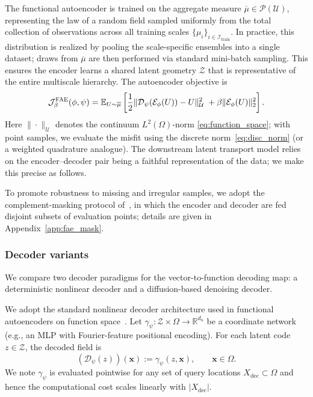\documentclass[review,onefignum,onetabnum]{siamart250211}
\newcommand{\E}{\mathbb{E}}
\newcommand{\R}{\mathbb{R}}
\newcommand{\1}{\mathbf{1}}
\newcommand{\cU}{\mathcal{U}}
\newcommand{\cZ}{\mathcal{Z}}
\newcommand{\cP}{\mathcal{P}}
\newcommand{\cJ}{\mathcal{J}}
\newcommand{\cE}{\mathcal{E}}
\newcommand{\cD}{\mathcal{D}}
\begin{document}
The functional autoencoder is trained on the aggregate measure $\overline{\mu} \in \cP(\cU)$, representing the law of a random field sampled uniformly from the total collection of observations across all training scales $\{ \mu_i \}_{i \in \mathcal{I}_{\mathrm{train}}}$. In practice, this distribution is realized by pooling the scale-specific ensembles into a single dataset; draws from $\overline{\mu}$ are then performed via standard mini-batch sampling. This ensures the encoder learns a shared latent geometry $\cZ$ that is representative of the entire multiscale hierarchy. The autoencoder objective is
\begin{equation}
\cJ_{\beta}^{\mathrm{\textsc{FAE}}}(\phi,\psi)
=
\E_{U \sim \overline{\mu}}\left[
\frac{1}{2}\|\cD_\psi(\cE_\phi(U)) - U\|_{\cU}^2
\;+\beta\|\cE_\phi(U)\|_2^2
\right].
\label{eq:fae_obj_cont}
\end{equation}
Here $\|\cdot\|_{\cU}$ denotes the continuum $L^2(\Omega)$-norm \eqref{eq:function_space}; with point samples, we evaluate the misfit using the discrete norm~\eqref{eq:disc_norm} (or a weighted quadrature analogue). The downstream latent transport model relies on the encoder--decoder pair being a faithful representation of the data; we make this precise as follows.

To promote robustness to missing and irregular samples, we adopt the complement-masking protocol of~\cite{bunker2025fae}, in which the encoder and decoder are fed disjoint subsets of evaluation points; details are given in Appendix~\ref{app:fae_mask}. 

\subsubsection{Decoder variants}\label{sec:decoder}
We compare two decoder paradigms for the vector-to-function decoding map: a deterministic nonlinear decoder and a diffusion-based denoising decoder.

We adopt the standard nonlinear decoder architecture used in functional autoencoders on function space~\cite{bunker2025fae}.
Let $\gamma_\psi:\cZ\times\Omega\to\R^{d_u}$ be a coordinate network (e.g., an MLP with Fourier-feature positional encoding).
For each latent code $z\in\cZ$, the decoded field is
\begin{equation}
(\cD_\psi(z))(\mathbf{x}) := \gamma_\psi(z,\mathbf{x}),\qquad \mathbf{x}\in\Omega .
\label{eq:coord_decoder}
\end{equation}
We note $\gamma_\psi$ is evaluated pointwise for any set of query locations $X_{\mathrm{dec}}\subset\Omega$ and hence the computational cost scales linearly with $|X_{\mathrm{dec}}|$.
\end{document}
